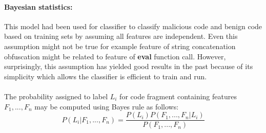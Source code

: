 \paragraph{Bayesian statistics:} 
This model had been used for classifier to classify malicious code and benign code based on training sets by assuming all features are independent.  Even this assumption might not be true for example feature of string concatenation obfuscation might be related to feature of \textbf{eval} function call. However, surprisingly, this assumption has yielded good results in the past because of its simplicity which allows the classifier is efficient to train and run. \\ \\
The probability assigned to label $L_{i}$ for code fragment containing features $F_{1},...,F_{n}$ may be computed using Bayes rule as follows: \\
$$P(L_{i}|F_{1},...,F_{n})=\frac{P(L_{i})P(F_{1},...,F_{n}|L_{i})}{P(F_{1},...,F_{n})}$$
\phantom \\